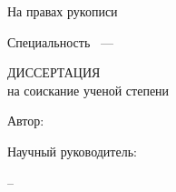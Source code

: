 
%
%
%
%

\thispagestyle{empty}

\begin{center}
\dissorg
\par
\end{center}

\vspace{10mm}
\begin{flushright}
На правах рукописи

\end{flushright}

\vspace{20mm}
\begin{center}
{\bf \large \dissauthor}
\end{center}

\vspace{5mm}
\begin{center}
{\bf \large \disstitle
\par}

\vspace{10mm}
{%
Специальность \specnum~---
\specname
}

\vspace{10mm}
ДИССЕРТАЦИЯ \\ на соискание ученой степени \\

\edudegree
\end{center}

\vspace{5mm}
\begin{flushleft}
	Автор:
\end{flushleft}

\vspace{5mm}
\begin{flushright}
Научный руководитель:

\mentordegree %

\mentorname
\end{flushright}





\vfill
\begin{center}
{\disscity -- \dissyear}
\end{center}

